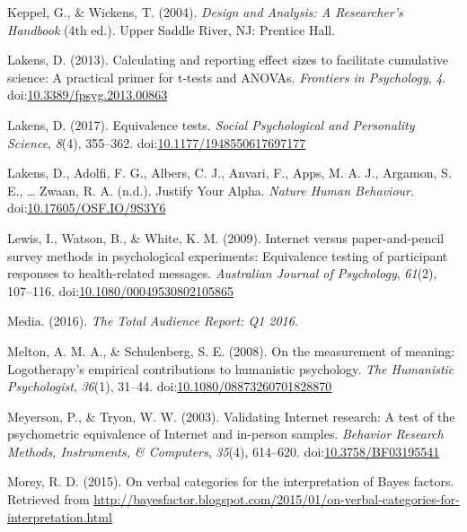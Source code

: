 \documentclass[english,man, mask]{apa6}
\theoremstyle{definition}
\theoremstyle{definition}
\theoremstyle{definition}
\theoremstyle{remark}
\begin{document}
\hypertarget{ref-Keppel2004}{}
Keppel, G., \& Wickens, T. (2004). \emph{Design and Analysis: A
Researcher's Handbook} (4th ed.). Upper Saddle River, NJ: Prentice Hall.

\hypertarget{ref-Lakens2013}{}
Lakens, D. (2013). Calculating and reporting effect sizes to facilitate
cumulative science: A practical primer for t-tests and ANOVAs.
\emph{Frontiers in Psychology}, \emph{4}.
doi:\href{https://doi.org/10.3389/fpsyg.2013.00863}{10.3389/fpsyg.2013.00863}

\hypertarget{ref-Lakens2017a}{}
Lakens, D. (2017). Equivalence tests. \emph{Social Psychological and
Personality Science}, \emph{8}(4), 355--362.
doi:\href{https://doi.org/10.1177/1948550617697177}{10.1177/1948550617697177}

\hypertarget{ref-Lakens2017}{}
Lakens, D., Adolfi, F. G., Albers, C. J., Anvari, F., Apps, M. A. J.,
Argamon, S. E., \ldots{} Zwaan, R. A. (n.d.). Justify Your Alpha.
\emph{Nature Human Behaviour}.
doi:\href{https://doi.org/10.17605/OSF.IO/9S3Y6}{10.17605/OSF.IO/9S3Y6}

\hypertarget{ref-Lewis2009}{}
Lewis, I., Watson, B., \& White, K. M. (2009). Internet versus
paper-and-pencil survey methods in psychological experiments:
Equivalence testing of participant responses to health-related messages.
\emph{Australian Journal of Psychology}, \emph{61}(2), 107--116.
doi:\href{https://doi.org/10.1080/00049530802105865}{10.1080/00049530802105865}

\hypertarget{ref-Media2016}{}
Media. (2016). \emph{The Total Audience Report: Q1 2016}.

\hypertarget{ref-Melton2008}{}
Melton, A. M. A., \& Schulenberg, S. E. (2008). On the measurement of
meaning: Logotherapy's empirical contributions to humanistic psychology.
\emph{The Humanistic Psychologist}, \emph{36}(1), 31--44.
doi:\href{https://doi.org/10.1080/08873260701828870}{10.1080/08873260701828870}

\hypertarget{ref-Meyerson2003}{}
Meyerson, P., \& Tryon, W. W. (2003). Validating Internet research: A
test of the psychometric equivalence of Internet and in-person samples.
\emph{Behavior Research Methods, Instruments, \& Computers},
\emph{35}(4), 614--620.
doi:\href{https://doi.org/10.3758/BF03195541}{10.3758/BF03195541}

\hypertarget{ref-Morey2015c}{}
Morey, R. D. (2015). On verbal categories for the interpretation of
Bayes factors. Retrieved from
\url{http://bayesfactor.blogspot.com/2015/01/on-verbal-categories-for-interpretation.html}
\end{document}
